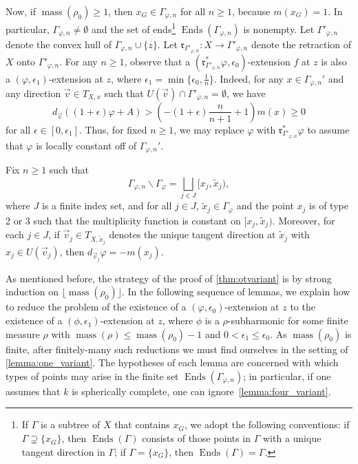 \documentclass[10pt,reqno]{amsart}
\theoremstyle{plain}
\theoremstyle{definition}
\numberwithin{equation}{section}
\DeclareMathOperator{\Ends}{Ends}
\DeclareMathOperator{\mass}{mass}
\begin{document}
Now, if $\mass(\rho_0) \geq 1$, then $x_G \in \Gamma_{\varphi,n}$ for all $n \geq 1$, because $m(x_G) = 1$. In particular, $\Gamma_{\varphi,n} \not= \emptyset$ and the set of ends\footnote{If $\Gamma$ is a subtree of $X$ that contains $x_G$, we adopt the following conventions: 
if $\Gamma \supsetneq \{ x_G \}$, then $\Ends(\Gamma)$ consists of those points in $\Gamma$ with a unique tangent direction in $\Gamma$;
if $\Gamma = \{ x_G \}$, then $\Ends(\Gamma) = \Gamma$.
} $\Ends(\Gamma_{\varphi,n})$ is nonempty. 
Let $\Gamma'_{\varphi,n}$ denote the convex hull of $\Gamma_{\varphi,n} \cup \{ z \}$. Let $\mathfrak{r}_{\Gamma'_{\varphi,n}} \colon X \to \Gamma'_{\varphi,n}$ denote the retraction of $X$ onto $\Gamma'_{\varphi,n}$. 
For any $n \geq 1$, observe that a $(\mathfrak{r}_{\Gamma'_{\varphi,n}}^* \varphi, \epsilon_0)$-extension $f$ at $z$ is also a $(\varphi,\epsilon_1)$-extension at $z$, where $\epsilon_1 = \min\{ \epsilon_0, \frac{1}{n} \}$. 
Indeed, for any $x \in \Gamma_{\varphi,n}'$ and any direction $\vec{v} \in T_{X,x}$ such that $U(\vec{v}) \cap \Gamma'_{\varphi,n} = \emptyset$, we have
$$
d_{\vec{v}}( (1 + \epsilon)\varphi + A ) > \left( - (1+\epsilon)\frac{n}{n+1} + 1 \right) m(x) \geq 0
$$
for all $\epsilon \in [0,\epsilon_1]$. Thus, for fixed $n \geq 1$, we may replace $\varphi$ with $\mathfrak{r}_{\Gamma'_{\varphi,n}}^* \varphi$ to assume that $\varphi$ is locally constant off of $\Gamma_{\varphi,n}'$. 


Fix $n \geq 1$ such that 
\begin{equation}\label{tree_decomposition}
\Gamma_{\varphi,n} \backslash \Gamma_{\varphi} = \bigsqcup_{j \in J} [x_j, \tilde{x}_j),
\end{equation}
where $J$ is a finite index set, and for all $j \in J$, $\tilde{x}_j \in \Gamma_{\varphi}$ and the point $x_j$ is of type 2 or 3 such that the multiplicity function is constant on $[x_j,\tilde{x}_j)$. Moreover, for each $j \in J$, if $\vec{v}_j \in T_{X,\tilde{x}_j}$ denotes the unique tangent direction at $\tilde{x}_j$ with $x_j \in U(\vec{v}_j)$, then $d_{\vec{v}_j} \varphi = -m(x_j)$. 


As mentioned before, the strategy of the proof of \cref{thm:otvariant} is by strong induction on $\lfloor \mass(\rho_0) \rfloor$. In the following sequence of lemmas, we explain how to reduce the problem of the existence of a $(\varphi, \epsilon_0)$-extension at $z$ to the existence of a $(\phi, \epsilon_1)$-extension at $z$, where $\phi$ is a $\rho$-subharmonic for some finite measure $\rho$ with $\mass(\rho) \leq \mass(\rho_0) - 1$ and $0 < \epsilon_1 \leq \epsilon_0$. 
As $\mass(\rho_0)$ is finite, after finitely-many such reductions we must find ourselves in the setting of \cref{lemma:one_variant}. The hypotheses of each lemma are concerned with which types of points may arise in the finite set $\Ends(\Gamma_{\varphi,n})$; in particular, if one assumes that $k$ is spherically complete, one can ignore~\cref{lemma:four_variant}. 
\end{document}
